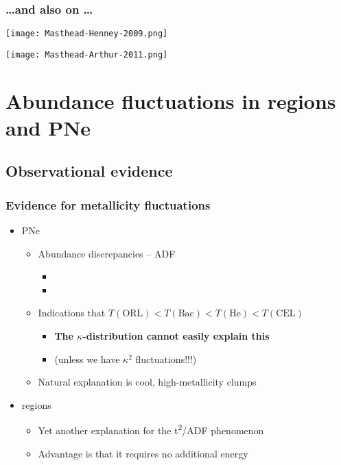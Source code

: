 \documentclass[presentation, compress]{beamer}
\providecommand{\alert}[1]{\textbf{#1}}
\begin{document}
\begin{frame}
  \frametitle{\dots and also on \dots}
  \begin{block}{}\centering
    \bigskip
    \texttt{[image: Masthead-Henney-2009.png]}
  \end{block}
  \begin{block}{}\centering
    \bigskip
    \texttt{[image: Masthead-Arthur-2011.png]}
  \end{block}
\end{frame}


\section{Abundance fluctuations in \hii{} regions and PNe}
\label{sec-3}
\subsection{Observational evidence}
\begin{frame}
\frametitle{Evidence for metallicity fluctuations}

\begin{itemize}
\item PNe
  \begin{itemize}
  \item Abundance discrepancies -- ADF 
    \begin{itemize}
    \item {}
    \item {}
    \end{itemize}
  \item Indications that \(T(\mathrm{ORL}) < T(\mathrm{Bac}) < T(\mathrm{He}) < T(\mathrm{CEL})\)
    \begin{itemize}
    \item \alert{The \(\kappa\)-distribution cannot easily explain this}
    \item (unless we have \(\kappa^2\) fluctuations!!!)
    \end{itemize}
  \item Natural explanation is cool, high-metallicity clumps
  \end{itemize}
\item \hii{} regions
  \begin{itemize}
  \item Yet another explanation for the t\textsuperscript{2}/ADF phenomenon
  \item Advantage is that it requires no additional energy
  \end{itemize}
\end{itemize}
\end{frame}
\end{document}
